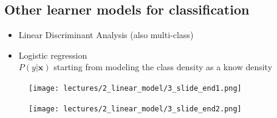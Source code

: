\documentclass[../main.tex]{subfiles}
\begin{document}
\subsection{Other learner models for classification}
\begin{itemize}
    \item Linear Discriminant Analysis (also multi-class)
    \item Logistic regression\\
    $P(y | \mathbf{x})$  starting from modeling the class density as a know density
\end{itemize}

\begin{figure}[H]
    \centering
    \texttt{[image: lectures/2\_linear\_model/3\_slide\_end1.png]}
\end{figure}
\begin{figure}[H]
    \centering
    \texttt{[image: lectures/2\_linear\_model/3\_slide\_end2.png]}
\end{figure}
\end{document}
